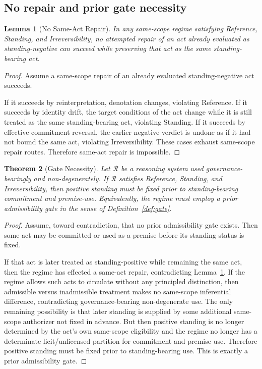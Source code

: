 \documentclass[11pt]{article}
\newtheorem{theorem}{Theorem}[section]
\newtheorem{lemma}[theorem]{Lemma}
\begin{document}
\subsection{No repair and prior gate necessity}

\begin{lemma}[No Same-Act Repair]
\label{lem:norepair}
In any same-scope regime satisfying Reference, Standing, and Irreversibility, no attempted repair of an act already evaluated as standing-negative can succeed while preserving that act as the same standing-bearing act.
\end{lemma}

\begin{proof}
Assume a same-scope repair of an already evaluated standing-negative act succeeds.

If it succeeds by reinterpretation, denotation changes, violating Reference. If it succeeds by identity drift, the target conditions of the act change while it is still treated as the same standing-bearing act, violating Standing. If it succeeds by effective commitment reversal, the earlier negative verdict is undone as if it had not bound the same act, violating Irreversibility. These cases exhaust same-scope repair routes. Therefore same-act repair is impossible.
\end{proof}

\begin{theorem}[Gate Necessity]
\label{thm:gatenec}
Let $\mathcal{R}$ be a reasoning system used governance-bearingly and non-degenerately. If $\mathcal{R}$ satisfies Reference, Standing, and Irreversibility, then positive standing must be fixed prior to standing-bearing commitment and premise-use. Equivalently, the regime must employ a prior admissibility gate in the sense of Definition~\ref{def:gate}.
\end{theorem}

\begin{proof}
Assume, toward contradiction, that no prior admissibility gate exists. Then some act may be committed or used as a premise before its standing status is fixed.

If that act is later treated as standing-positive while remaining the same act, then the regime has effected a same-act repair, contradicting Lemma~\ref{lem:norepair}. If the regime allows such acts to circulate without any principled distinction, then admissible versus inadmissible treatment makes no same-scope inferential difference, contradicting governance-bearing non-degenerate use. The only remaining possibility is that later standing is supplied by some additional same-scope authorizer not fixed in advance. But then positive standing is no longer determined by the act's own same-scope eligibility and the regime no longer has a determinate licit/unlicensed partition for commitment and premise-use. Therefore positive standing must be fixed prior to standing-bearing use. This is exactly a prior admissibility gate.
\end{proof}
\end{document}
